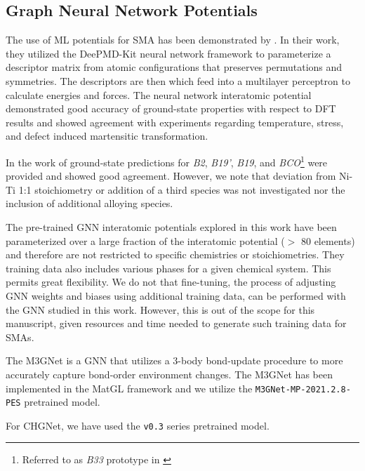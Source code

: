 \documentclass[preprint,colorlinks=true,linkcolor=black,citecolor=black]{elsarticle}
\begin{document}
\subsection{Graph Neural Network Potentials}

The use of ML potentials for SMA has been demonstrated by
\citet{Tang2022}. In their work, they utilized the
DeePMD-Kit\cite{Wang2018} neural network framework to parameterize a
descriptor matrix from atomic configurations that preserves
permutations and symmetries. The descriptors are then which feed into
a multilayer perceptron to calculate energies and forces. The neural
network interatomic potential demonstrated good accuracy of
ground-state properties with respect to DFT results and showed
agreement with experiments regarding temperature, stress, and defect
induced martensitic transformation. \paragraphmark

In the work of \citet{Tang2022} ground-state predictions for
\textit{B2}, \textit{B19'}, \textit{B19}, and
\textit{BCO}\footnote{Referred to as \textit{B33} prototype in
  \citet{Tang2022}} were provided and showed good agreement. However,
we note that deviation from Ni-Ti 1:1 stoichiometry or addition of a
third species was not investigated nor the inclusion of additional
alloying species. \par

The pre-trained GNN interatomic potentials explored in this work have
been parameterized over a large fraction of the interatomic potential
($>$ 80 elements) and therefore are not restricted to specific
chemistries or stoichiometries. They training data also includes
various phases for a given chemical system. This permits great
flexibility. We do not that fine-tuning, the process of adjusting GNN
weights and biases using additional training data, can be performed
with the GNN studied in this work. However, this is out of the scope
for this manuscript, given resources and time needed to generate such
training data for SMAs. \par

The M3GNet is a GNN that utilizes a 3-body bond-update procedure to
more accurately capture bond-order environment changes. The M3GNet has
been implemented in the MatGL framework and we utilize the
\texttt{M3GNet-MP-2021.2.8-PES} pretrained model.

For CHGNet, we have used the \texttt{v0.3} series pretrained model.

\end{document}
